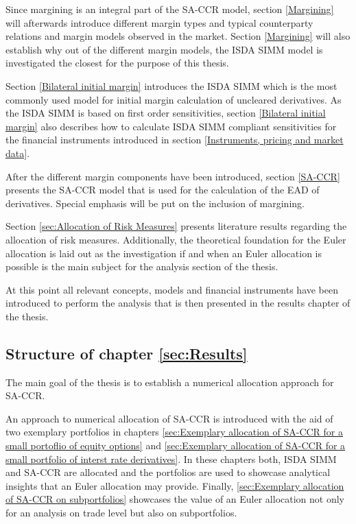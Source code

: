 \documentclass[../Thesis_AHoecherl.tex]{subfiles}
\begin{document}
    Since margining is an integral part of the \gls{SA-CCR} model, section \ref{Margining} will afterwards introduce different margin types and typical counterparty relations and margin models observed in the market. Section \ref{Margining} will also establish why out of the different margin models, the \gls{ISDA SIMM} model is investigated the closest for the purpose of this thesis.

    Section \ref{Bilateral initial margin} introduces the \gls{ISDA SIMM} which is the most commonly used model for initial margin calculation of uncleared derivatives. As the \gls{ISDA SIMM} is based on first order sensitivities, section \ref{Bilateral initial margin} also describes how to calculate \gls{ISDA SIMM} compliant sensitivities for the financial instruments introduced in section \ref{Instruments, pricing and market data}.

    After the different margin components have been introduced, section \ref{SA-CCR} presents the \gls{SA-CCR} model that is used for the calculation of the \gls{EAD} of derivatives. Special emphasis will be put on the inclusion of margining.

    Section \ref{sec:Allocation of Risk Measures} presents literature results regarding the allocation of risk measures. Additionally, the theoretical foundation for the Euler allocation is laid out as the investigation if and when an Euler allocation is possible is the main subject for the analysis section of the thesis.

    At this point all relevant concepts, models and financial instruments have been introduced to perform the analysis that is then presented in the results chapter of the thesis. 
    
    \subsection{Structure of chapter \ref{sec:Results}}
    
    The main goal of the thesis is to establish a numerical allocation approach for \gls{SA-CCR}.

    An approach to numerical allocation of \gls{SA-CCR} is introduced with the aid of two exemplary portfolios in chapters \ref{sec:Exemplary allocation of SA-CCR for a small portoflio of equity options} and \ref{sec:Exemplary allocation of SA-CCR for a small portfolio of interst rate derivatives}. 
    In these chapters both, \gls{ISDA SIMM} and \gls{SA-CCR} are allocated and the portfolios are used to showcase analytical insights that an Euler allocation may provide. Finally, \ref{sec:Exemplary allocation of SA-CCR on subportfolios} showcases the value of an Euler allocation not only for an analysis on trade level but also on subportfolios.
\end{document}
